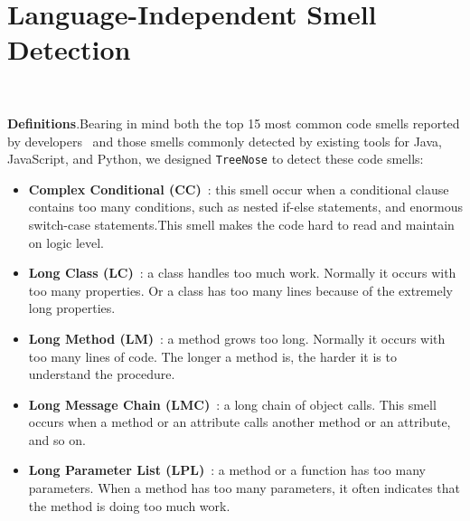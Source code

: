 


\vspace*{-0.5em}

\section{Language-Independent Smell Detection}~\label{sec:approach}

\vspace*{-1em}


{\bf Definitions}.Bearing in mind both the top 15 most common code smells
reported by developers~\cite{developersCare} and those smells commonly detected
by existing tools for Java, JavaScript, and Python, we designed
\texttt{TreeNose} to detect these code smells:

\begin{itemize}[leftmargin=*]
	\item \textbf{Complex Conditional (CC)}~\cite{Fowler_Beck}: this smell occur
	      when a conditional clause contains too many conditions, such as nested
	      if-else statements, and enormous switch-case statements.This smell makes
	      the code hard to read and maintain on logic level.
	\item \textbf{Long Class (LC)}~\cite{Fowler_Beck}: a class handles too much
	      work. Normally it occurs with too many properties. Or a class has too many
	      lines because of the extremely long properties.
	\item \textbf{Long Method (LM)}~\cite{Fowler_Beck}: a method grows too long. Normally
	      it occurs with too many lines of code. The longer a method is, the harder it is
	      to understand the procedure.
	\item \textbf{Long Message Chain (LMC)}~\cite{Fowler_Beck}: a long chain of object
	      calls. This smell occurs when a method or an attribute calls another method or
	      an attribute, and so on.
	\item \textbf{Long Parameter List (LPL)}~\cite{Fowler_Beck}: a method or a function
	      has too many parameters. When a method has too many parameters, it often
	      indicates that the method is doing too much work.
\end{itemize}


